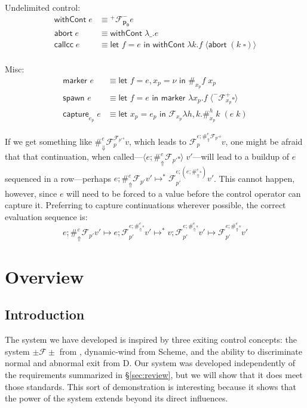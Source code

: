 \documentclass[11pt]{article}
\newcommand\x{\lambda x}
\newcommand{\letin}[2]{\textsf{let }#1\textsf{ in }#2}
\newcommand\F{\mathcal{F}}
\newcommand{\angles}[1]{\langle#1\rangle}
\begin{document}
Undelimited control:
\begin{align*}
\textsf{withCont}\;e &\equiv
	{}^+\F^-_\mathbf{p_0}e
	\\
\textsf{abort}\;e &\equiv
	\textsf{withCont}\;\lambda \_.e
	\\
\textsf{callcc}\;e &\equiv
	\letin{f=e}{\textsf{withCont}\;\lambda k. f\; \angles{\textsf{abort}\;(k\;\square)}}
	\\
\end{align*}

Misc:
\begin{align*}
\textsf{marker }e &\equiv
	\letin{f=e, x_p=\nu}{\#_{x_p}f\;x_p}
	\\
\textsf{spawn }e &\equiv
	\letin{f=e}{\textsf{marker }\x_p.f\;\angles{^-\F^+_{x_p}\square}}
	\\
\textsf{capture}_{e_p}\;e &\equiv
	\letin{x_p=e_p}{\F_{x_p}\lambda h,k.\#_{x_p}^hk\;(e\;k)}
\end{align*}


If we get something like $\#_\Downarrow^e\F_p^{\F_{p'}\square}v$,
which leads to $\F_p^{e;\#_\Uparrow^e\F_{p'}\square}v$,
one might be afraid that that continuation, when called---$\angles{e;\#_\Uparrow^e\F_{p'}\square}\;v'$---will lead to a buildup of $e$ sequenced in a row---perhaps $e;\#_\Uparrow^e\F_{p'}v' \mapsto^* \F_{p'}^{e;(e;\#_\Uparrow^e\square)}v'$.
This cannot happen, however, since $e$ will need to be forced to a value before the control operator can capture it.
Preferring to capture continuations wherever possible, the correct evaluation sequence is:
$$ e;\#_\Uparrow^e\F_{p'}v' \mapsto
e;\F_{p'}^{e;\#_\Uparrow^e\square}v' \mapsto^*
v;\F_{p'}^{e;\#_\Uparrow^e\square}v' \mapsto
\F_{p'}^{e;\#_\Uparrow^e\square}v' $$





\section{Overview}
\label{system-overview}

\subsection{Introduction}

The system we have developed is inspired by three exiting control concepts: the system $\pm\mathcal{F}\pm$ from \cite{MFDC}, dynamic-wind from Scheme, and the ability to discriminate normal and abnormal exit from D.
Our system was developed independently of the requirements summarized in \S\ref{sec:review}, but we will show that it does meet those standards.
This sort of demonstration is interesting because it shows that the power of the system extends beyond its direct influences.
\end{document}
